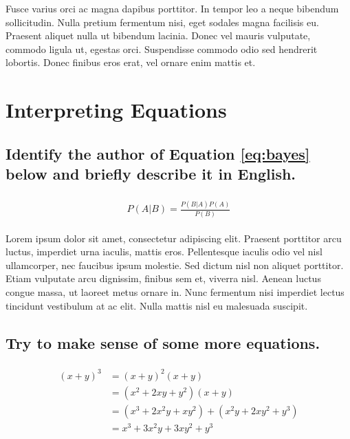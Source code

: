 \documentclass[11pt]{scrartcl} %
\begin{document}
Fusce varius orci ac magna dapibus porttitor. In tempor leo a neque bibendum sollicitudin. Nulla pretium fermentum nisi, eget sodales magna facilisis eu. Praesent aliquet nulla ut bibendum lacinia. Donec vel mauris vulputate, commodo ligula ut, egestas orci. Suspendisse commodo odio sed hendrerit lobortis. Donec finibus eros erat, vel ornare enim mattis et.


\section{Interpreting Equations}

\subsection{Identify the author of Equation \ref{eq:bayes} below and briefly describe it in English.}

\begin{align} 
	\label{eq:bayes}
	\begin{split}
		P(A|B) = \frac{P(B|A)P(A)}{P(B)}
	\end{split}					
\end{align}

Lorem ipsum dolor sit amet, consectetur adipiscing elit. Praesent porttitor arcu luctus, imperdiet urna iaculis, mattis eros. Pellentesque iaculis odio vel nisl ullamcorper, nec faucibus ipsum molestie. Sed dictum nisl non aliquet porttitor. Etiam vulputate arcu dignissim, finibus sem et, viverra nisl. Aenean luctus congue massa, ut laoreet metus ornare in. Nunc fermentum nisi imperdiet lectus tincidunt vestibulum at ac elit. Nulla mattis nisl eu malesuada suscipit.


\subsection{Try to make sense of some more equations.}

\begin{align} 
	\begin{split}
		(x+y)^3 &= (x+y)^2(x+y)\\
		&=(x^2+2xy+y^2)(x+y)\\
		&=(x^3+2x^2y+xy^2) + (x^2y+2xy^2+y^3)\\
		&=x^3+3x^2y+3xy^2+y^3
	\end{split}					
\end{align}
\end{document}
